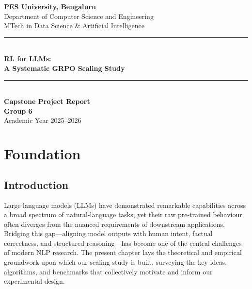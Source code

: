 \documentclass[12pt,a4paper]{report}
\theoremstyle{definition}
\begin{document}
\label{ch:lit-survey}

\begin{titlepage}
  \centering
  \vspace*{1.5cm}

  {\LARGE\bfseries PES University, Bengaluru}\\[0.4cm]
  {\large Department of Computer Science and Engineering}\\[0.3cm]
  {\large MTech in Data Science \& Artificial Intelligence}\\[2.5cm]

  \rule{\textwidth}{1.2pt}\\[0.5cm]
  {\Huge\bfseries RL for LLMs:\\[0.3em]
   A Systematic GRPO Scaling Study}\\[0.5cm]
  \rule{\textwidth}{1.2pt}\\[2cm]

  {\Large\textbf{Capstone Project Report}}\\[1.5cm]

  {\large\textbf{Group 6}}\\[2.5cm]

  \vfill
  {\large Academic Year 2025--2026}
\end{titlepage}

\setcounter{chapter}{1}          %
\chapter{Foundation}
\label{ch:foundation}

\section{Introduction}
\label{sec:foundation-intro}

Large language models (LLMs) have demonstrated remarkable capabilities across
a broad spectrum of natural-language tasks, yet their raw pre-trained behaviour
often diverges from the nuanced requirements of downstream applications.
Bridging this gap---aligning model outputs with human intent, factual
correctness, and structured reasoning---has become one of the central
challenges of modern NLP research.  The present chapter lays the theoretical
and empirical groundwork upon which our scaling study is built, surveying the
key ideas, algorithms, and benchmarks that collectively motivate and inform
our experimental design.
\end{document}
